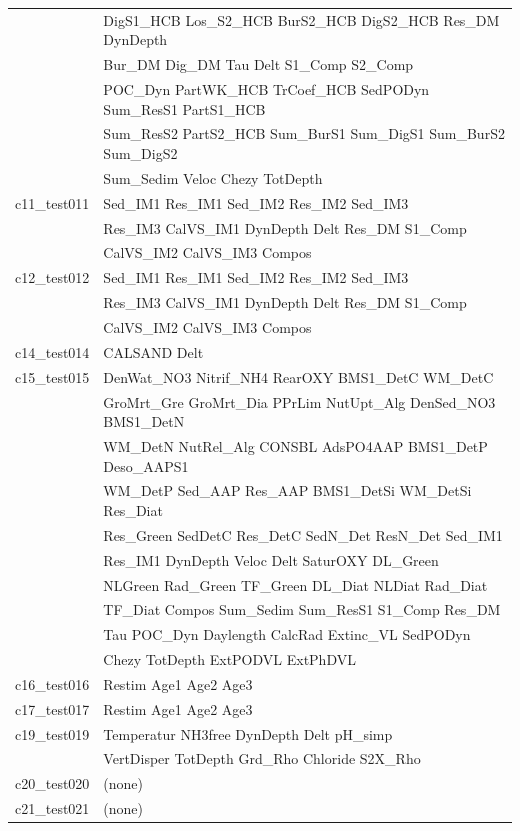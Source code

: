 \begin{longtable}{ll}
 & DigS1\_HCB Los\_S2\_HCB BurS2\_HCB DigS2\_HCB Res\_DM DynDepth \\ 
 & Bur\_DM Dig\_DM Tau Delt S1\_Comp S2\_Comp \\ 
 & POC\_Dyn PartWK\_HCB TrCoef\_HCB SedPODyn Sum\_ResS1 PartS1\_HCB \\ 
 & Sum\_ResS2 PartS2\_HCB Sum\_BurS1 Sum\_DigS1 Sum\_BurS2 Sum\_DigS2 \\ 
 & Sum\_Sedim Veloc Chezy TotDepth \\
c11\_test011 & Sed\_IM1 Res\_IM1 Sed\_IM2 Res\_IM2 Sed\_IM3 \\ 
 & Res\_IM3 CalVS\_IM1 DynDepth Delt Res\_DM S1\_Comp \\ 
 & CalVS\_IM2 CalVS\_IM3 Compos \\
c12\_test012 & Sed\_IM1 Res\_IM1 Sed\_IM2 Res\_IM2 Sed\_IM3 \\ 
 & Res\_IM3 CalVS\_IM1 DynDepth Delt Res\_DM S1\_Comp \\ 
 & CalVS\_IM2 CalVS\_IM3 Compos \\
c14\_test014 & CALSAND Delt \\
c15\_test015 & DenWat\_NO3 Nitrif\_NH4 RearOXY BMS1\_DetC WM\_DetC \\ 
 & GroMrt\_Gre GroMrt\_Dia PPrLim NutUpt\_Alg DenSed\_NO3 BMS1\_DetN \\ 
 & WM\_DetN NutRel\_Alg CONSBL AdsPO4AAP BMS1\_DetP Deso\_AAPS1 \\ 
 & WM\_DetP Sed\_AAP Res\_AAP BMS1\_DetSi WM\_DetSi Res\_Diat \\ 
 & Res\_Green SedDetC Res\_DetC SedN\_Det ResN\_Det Sed\_IM1 \\ 
 & Res\_IM1 DynDepth Veloc Delt SaturOXY DL\_Green \\ 
 & NLGreen Rad\_Green TF\_Green DL\_Diat NLDiat Rad\_Diat \\ 
 & TF\_Diat Compos Sum\_Sedim Sum\_ResS1 S1\_Comp Res\_DM \\ 
 & Tau POC\_Dyn Daylength CalcRad Extinc\_VL SedPODyn \\ 
 & Chezy TotDepth ExtPODVL ExtPhDVL \\
c16\_test016 & Restim Age1 Age2 Age3 \\
c17\_test017 & Restim Age1 Age2 Age3 \\
c19\_test019 & Temperatur NH3free DynDepth Delt pH\_simp \\ 
 & VertDisper TotDepth Grd\_Rho Chloride S2X\_Rho \\
c20\_test020 & (none) \\
c21\_test021 & (none) \\

\end{longtable}
